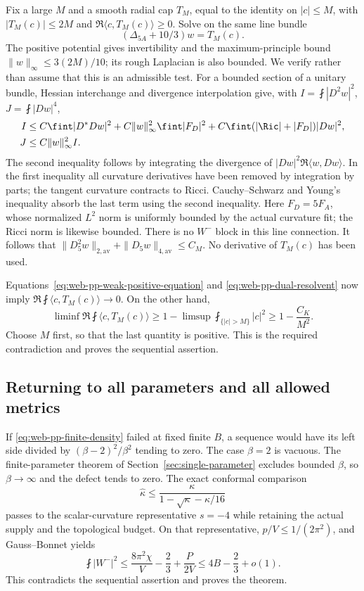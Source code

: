 Fix a large \(M\) and a smooth radial cap \(T_M\), equal to the identity
on \(|c|\le M\), with \(|T_M(c)|\le2M\) and
\(\Re\langle c,T_M(c)\rangle\ge0\).  Solve on the same line bundle
\begin{equation}
 (\Delta_{5A}+10/3)w=T_M(c).
 \label{eq:web-pp-dual-resolvent}
\end{equation}
The positive potential gives invertibility and the maximum-principle bound
\(\|w\|_\infty\le3(2M)/10\); its rough Laplacian is also bounded.
We verify rather than assume that this is an admissible test.  For a bounded
section of a unitary bundle, Hessian interchange and divergence interpolation
give, with \(I=\fint|D^2w|^2\), \(J=\fint|Dw|^4\),
\begin{align}
 I&\le C\fint|D^*Dw|^2+C\|w\|_\infty^2\fint|F_D|^2
       +C\fint(|\Ric|+|F_D|)|Dw|^2,\label{eq:web-pp-hessian-test}\\
 J&\le C\|w\|_\infty^2I.\label{eq:web-pp-interpolation-test}
\end{align}
The second inequality follows by integrating the divergence of
\(|Dw|^2\Re\langle w,Dw\rangle\).  In the first inequality all
curvature derivatives have been removed by integration by parts; the tangent
curvature contracts to Ricci.  Cauchy--Schwarz and Young's inequality absorb
the last term using the second inequality.  Here \(F_D=5F_A\), whose
normalized \(L^2\) norm is uniformly bounded by the actual curvature fit;
the Ricci norm is likewise bounded.  There is no \(W^-\) block in this
line connection.  It follows that
\(\|D_5^2w\|_{2,\mathrm{av}}+\|D_5w\|_{4,\mathrm{av}}\le C_M\).
No derivative of \(T_M(c)\) has been used.

Equations~\eqref{eq:web-pp-weak-positive-equation} and
\eqref{eq:web-pp-dual-resolvent} now imply
\(\Re\fint\langle c,T_M(c)\rangle\to0\).  On the other hand,
\[
 \liminf\Re\fint\langle c,T_M(c)\rangle
 \ge1-\limsup\fint_{\{|c|>M\}}|c|^2
 \ge1-\frac{C_K}{M^2}.
\]
Choose \(M\) first, so that the last quantity is positive.  This is the
required contradiction and proves the sequential assertion.

\subsection{Returning to all parameters and all allowed metrics}

If \eqref{eq:web-pp-finite-density} failed at fixed finite \(B\), a
sequence would have its left side divided by
\((\beta-2)^2/\beta^2\) tending to zero.  The case \(\beta=2\) is
vacuous.  The finite-parameter theorem of
Section~\ref{sec:single-parameter} excludes bounded \(\beta\), so
\(\beta\to\infty\) and the defect tends to zero.  The exact conformal
comparison
\[
 \widehat\kappa\le
 \frac{\kappa}{1-\sqrt\kappa-\kappa/16}
\]
passes to the scalar-curvature representative \(s=-4\) while retaining
the actual supply and the topological budget.  On that representative,
\(p/V\le1/(2\pi^2)\), and Gauss--Bonnet yields
\[
 \fint|W^-|^2\le\frac{8\pi^2\chi}{V}-\frac23+\frac{P}{2V}
           \le4B-\frac23+o(1).
\]
This contradicts the sequential assertion and proves the theorem.

